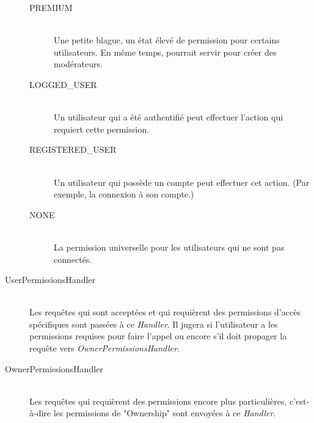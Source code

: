 \documentclass[10pt,a4paper]{report}
\begin{document}
\begin{flushleft}
\begin{description}
\begin{description}
\item[PREMIUM]\hfill \\ Une petite blague, un état élevé de permission pour certains utilisateurs. En même temps, pourrait servir pour créer des modérateurs.\\
\item[LOGGED\_USER] \hfill \\ Un utilisateur qui a été authentifié peut effectuer l'action qui requiert cette permission.\\
\item[REGISTERED\_USER] \hfill \\ Un utilisateur qui possède un compte peut effectuer cet action. (Par exemple, la connexion à son compte.)\\
\item[NONE] \hfill \\ La permission universelle pour les utilisateurs qui ne sont pas connectés.\\
\end{description}
\item[UserPermissionsHandler] \hfill \\ Les requêtes qui sont acceptées et qui requièrent des permissions d'accès spécifiques sont passées à ce \emph{Handler}. Il jugera si l'utilisateur a les permissions requises pour faire l'appel ou encore s'il doit propager la requête vers \emph{OwnerPermissionsHandler}.\\
\item[OwnerPermissionsHandler] \hfill \\ Les requêtes qui requièrent des permissions encore plus particulières, c'est-à-dire les permissions de "Ownership" sont envoyées à ce \emph{Handler}.\\
\end{description}
\bigskip

\end{flushleft}
\end{document}
